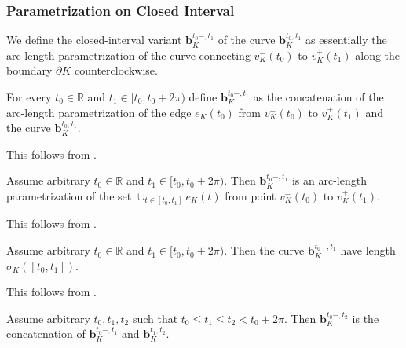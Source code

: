 \subsubsection{Parametrization on Closed Interval}

We define the closed-interval variant \(\mathbf{b}_K^{t_0-, t_1}\) of the curve \(\mathbf{b}_K^{t_0, t_1}\) as essentially the arc-length parametrization of the curve connecting \(v_K^-(t_0)\) to \(v_K^+(t_1)\) along the boundary \(\partial K\) counterclockwise.

\begin{definition}

For every \(t_0 \in \mathbb{R}\) and \(t_1 \in [t_0, t_0 + 2\pi)\) define \(\mathbf{b}_K^{t_0-, t_1}\) as the concatenation of the arc-length parametrization of the edge \(e_K(t_0)\) from \(v_K^-(t_0)\) to \(v_K^+(t_1)\) and the curve \(\mathbf{b}_K^{t_0, t_1}\).

\label{def:closed-param}
\end{definition}

This follows from .

\begin{corollary}

Assume arbitrary \(t_0 \in \mathbb{R}\) and \(t_1 \in [t_0, t_0 + 2\pi)\). Then \(\mathbf{b}_K^{t_0-, t_1}\) is an arc-length parametrization of the set \(\cup_{t \in [t_0, t_1]} e_K(t)\) from point \(v_K^-(t_0)\) to \(v_K^+(t_1)\).

\label{cor:closed-param-segment}
\end{corollary}

This follows from .

\begin{corollary}

Assume arbitrary \(t_0 \in \mathbb{R}\) and \(t_1 \in [t_0, t_0 + 2\pi)\). Then the curve \(\mathbf{b}_K^{t_0-, t_1}\) have length \(\sigma_K([t_0, t_1])\).

\label{cor:closed-param-segment-length}
\end{corollary}

This follows from .

\begin{corollary}

Assume arbitrary \(t_0, t_1, t_2\) such that \(t_0 \leq t_1 \leq t_2 < t_0 + 2\pi\). Then \(\mathbf{b}_{K}^{t_0-, t_2}\) is the concatenation of \(\mathbf{b}_{K}^{t_0-, t_1}\) and \(\mathbf{b}_{K}^{t_1, t_2}\).

\label{cor:closed-param-concatenation}
\end{corollary}

